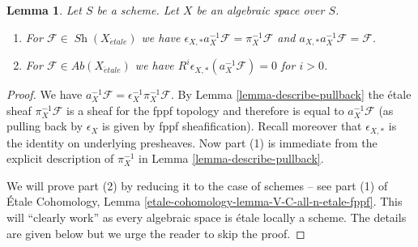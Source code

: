 \documentclass{stacks-project}
\theoremstyle{plain}
\newtheorem{lemma}[subsection]{Lemma}
\theoremstyle{definition}
\theoremstyle{remark}
\numberwithin{equation}{subsection}
\def\Sh{\mathop{\mathit{Sh}}\nolimits}
\def\etale{{\acute{e}tale}}
\begin{document}
\begin{lemma}
\label{lemma-comparison-fppf-etale}
Let $S$ be a scheme. Let $X$ be an algebraic space over $S$.
\begin{enumerate}
\item For $\mathcal{F} \in \Sh(X_\etale)$ we have
$\epsilon_{X, *}a_X^{-1}\mathcal{F} = \pi_X^{-1}\mathcal{F}$
and $a_{X, *}a_X^{-1}\mathcal{F} = \mathcal{F}$.
\item For $\mathcal{F} \in \textit{Ab}(X_\etale)$ we have
$R^i\epsilon_{X, *}(a_X^{-1}\mathcal{F}) = 0$ for $i > 0$.
\end{enumerate}
\end{lemma}

\begin{proof}
We have $a_X^{-1}\mathcal{F} = \epsilon_X^{-1} \pi_X^{-1}\mathcal{F}$.
By Lemma \ref{lemma-describe-pullback} the \'etale sheaf
$\pi_X^{-1}\mathcal{F}$ is a sheaf for the fppf topology
and therefore is equal to $a_X^{-1}\mathcal{F}$ (as pulling
back by $\epsilon_X$ is given by fppf sheafification).
Recall moreover that $\epsilon_{X, *}$ is the identity
on underlying presheaves.
Now part (1) is immediate from the explicit description of $\pi_X^{-1}$
in Lemma \ref{lemma-describe-pullback}.

\medskip\noindent
We will prove part (2) by reducing it to the case of schemes --
see part (1) of
\'Etale Cohomology, Lemma \ref{etale-cohomology-lemma-V-C-all-n-etale-fppf}.
This will ``clearly work'' as every algebraic space is
\'etale locally a scheme. The details are given below but we urge
the reader to skip the proof.


\end{proof}
\end{document}
